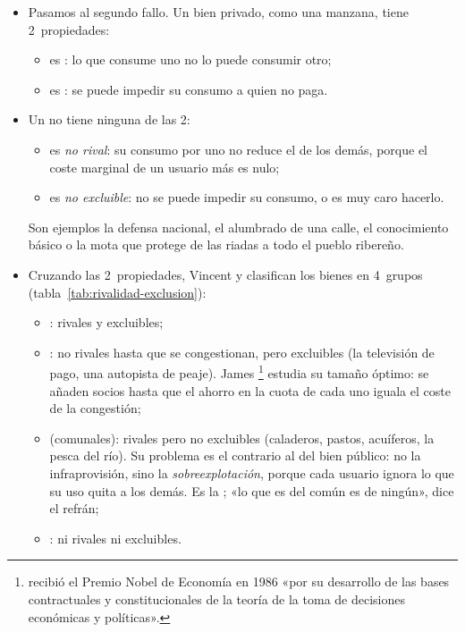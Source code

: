 \documentclass[11pt]{article}
\begin{document}
\begin{itemize}
\item Pasamos al segundo fallo. Un bien privado, como una manzana, tiene 2~propiedades:
  \begin{itemize}
  \item es : lo que consume uno no lo puede consumir otro;
  \item es : se puede impedir su consumo a quien no paga.
  \end{itemize}
\item Un  no tiene ninguna de las 2\nocite{Samuelson1954Pure}:
  \begin{itemize}
  \item es \emph{no rival}: su consumo por uno no reduce el de los demás, porque el coste marginal de un usuario más es nulo;
  \item es \emph{no excluible}: no se puede impedir su consumo, o es muy caro hacerlo.
  \end{itemize}
  Son ejemplos la defensa nacional, el alumbrado de una calle, el conocimiento básico o la mota que protege de las riadas a todo el pueblo ribereño.
\item Cruzando las 2~propiedades, Vincent y \nocite{OstromOstrom1977Public} clasifican los bienes en 4~grupos (tabla~\ref{tab:rivalidad-exclusion}):
  \begin{itemize}
  \item {}: rivales y excluibles;
  \item {}: no rivales hasta que se congestionan, pero excluibles (la televisión de pago, una autopista de peaje). James \textcite{Buchanan1965Economic}\footnote{ recibió el Premio Nobel de Economía en 1986 «por su desarrollo de las bases contractuales y constitucionales de la teoría de la toma de decisiones económicas y políticas»\nocite{Nobel1986Buchanan}.} estudia su tamaño óptimo: se añaden socios hasta que el ahorro en la cuota de cada uno iguala el coste de la congestión;
  \item {} (comunales): rivales pero no excluibles (caladeros, pastos, acuíferos, la pesca del río). Su problema es el contrario al del bien público: no la infraprovisión, sino la \emph{sobreexplotación}, porque cada usuario ignora lo que su uso quita a los demás. Es la \nocite{Hardin1968Tragedy}; «lo que es del común es de ningún», dice el refrán;
  \item {}: ni rivales ni excluibles.
  \end{itemize}
\end{itemize}
\end{document}
